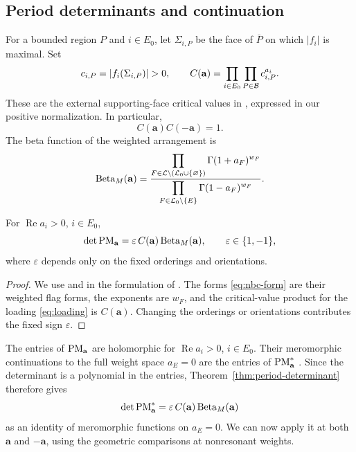 \subsection{Period determinants and continuation}\label{subsec:period-determinant}
For a bounded region $P$ and $i\in E_0$, let $\Sigma_{i,P}$ be
the face of $\bar P$ on which $|f_i|$ is maximal. Set
\[
 c_{i,P}=|f_i(\Sigma_{i,P})|>0,\qquad
 C(\mathbf a)=\prod_{i\in E_0}\prod_{P\in\cB}c_{i,P}^{a_i}.
\]
These are the external supporting-face critical values in
\cite[Sections 2.6 and 4.3.2]{MukherjeeVarchenko2009}, expressed in
our positive normalization. In particular,
\begin{equation}\label{eq:critical-cancellation}
 C(\mathbf a)C(-\mathbf a)=1.
\end{equation}
The beta function of the weighted arrangement is
\[
 \operatorname{Beta}_M(\mathbf a)
 =\frac{\displaystyle
      \prod_{F\in\mathcal L\setminus(\mathcal L_0\cup\{\varnothing\})}
          \Gamma(1+a_F)^{w_F}}
        {\displaystyle
      \prod_{F\in\mathcal L_0\setminus\{E\}}\Gamma(1-a_F)^{w_F}}.
\]

\begin{theorem}\label{thm:period-determinant}
For $\operatorname{Re}a_i>0$, $i\in E_0$,
\[
 \det\mathrm{PM}_{\mathbf a}=\varepsilon\, C(\mathbf a)\operatorname{Beta}_M(\mathbf a),
 \qquad\varepsilon\in\{1,-1\},
\]
where $\varepsilon$ depends only on the fixed orderings and orientations.
\end{theorem}
\begin{proof}
We use \cite{LoeserSabbah1991} and
\cite[Theorem 5.1.1]{DouaiTerao1997} in the formulation of
\cite[Theorem 4.1 and Sections 2.5, 4.2.1, 4.3]{MukherjeeVarchenko2009}.
The forms \eqref{eq:nbc-form} are their weighted flag forms, the
exponents are $w_F$, and the critical-value product for the loading
\eqref{eq:loading} is $C(\mathbf a)$. Changing the orderings or
orientations contributes the fixed sign $\varepsilon$.
\end{proof}

The entries of $\mathrm{PM}_{\mathbf a}$ are holomorphic for
$\operatorname{Re}a_i>0$, $i\in E_0$. Their meromorphic continuations
to the full weight space $a_E=0$ are the entries of $\mathrm{PM}^*_{\mathbf a}$
\cite[Remark 3.3.3]{DouaiTerao1997}.
Since the determinant is a polynomial in the entries,
Theorem~\ref{thm:period-determinant} therefore gives
\[
 \det\mathrm{PM}^*_{\mathbf a}=\varepsilon\,C(\mathbf a)\operatorname{Beta}_M(\mathbf a)
\]
as an identity of meromorphic functions on $a_E=0$. We can now
apply it at both $\mathbf a$ and $-\mathbf a$, using the geometric
comparisons at nonresonant weights.

